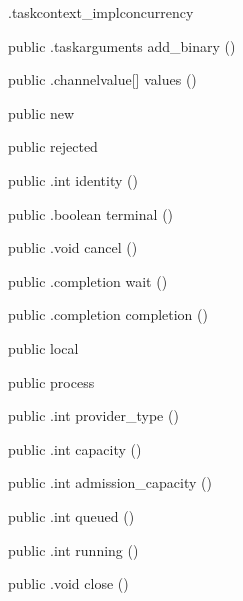 \begin{CrexxClass}{.taskcontext\_impl}{concurrency}
\begin{Members}
    \Method
      {public}
      {.taskarguments}
      {add\_binary}
      {()}

    \Method
      {public}
      {.channelvalue[]}
      {values}
      {()}

    \Factory
      {public}
      {new}
      {}

    \Factory
      {public}
      {rejected}
      {}

    \Method
      {public}
      {.int}
      {identity}
      {()}

    \Method
      {public}
      {.boolean}
      {terminal}
      {()}

    \Method
      {public}
      {.void}
      {cancel}
      {()}

    \Method
      {public}
      {.completion}
      {wait}
      {()}

    \Method
      {public}
      {.completion}
      {completion}
      {()}

    \Factory
      {public}
      {local}
      {}

    \Factory
      {public}
      {process}
      {}

    \Method
      {public}
      {.int}
      {provider\_type}
      {()}

    \Method
      {public}
      {.int}
      {capacity}
      {()}

    \Method
      {public}
      {.int}
      {admission\_capacity}
      {()}

    \Method
      {public}
      {.int}
      {queued}
      {()}

    \Method
      {public}
      {.int}
      {running}
      {()}

    \Method
      {public}
      {.void}
      {close}
      {()}


\end{Members}
\end{CrexxClass}
